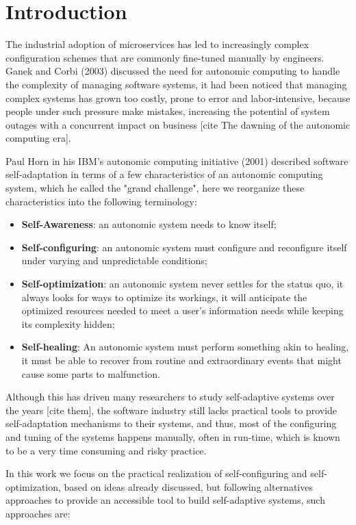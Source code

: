 \section{Introduction}

The industrial adoption of microservices has led to increasingly complex configuration schemes that are commonly fine-tuned manually by engineers. Ganek and Corbi (2003) discussed the need for autonomic computing to handle the complexity of managing software systems, it had been noticed that managing complex systems has grown too costly, prone to error and labor-intensive, because people under such pressure make mistakes, increasing the potential of system outages with a concurrent impact on business [cite The dawning of the autonomic computing era].

Paul Horn in his IBM's autonomic computing initiative (2001) described software self-adaptation in terms of a few characteristics of an autonomic computing system, which he called the "grand challenge", here we reorganize these characteristics into the following terminology:

\begin{itemize}
  \item \textbf{Self-Awareness}: an autonomic system needs to know itself;
  \item \textbf{Self-configuring}: an autonomic system must configure and reconfigure itself under varying and unpredictable conditions;
  \item \textbf{Self-optimization}: an autonomic system never settles for the status quo, it always looks for ways to optimize its workings, it will anticipate the optimized resources needed to meet a user's information needs while keeping its complexity hidden;
  \item \textbf{Self-healing}: An autonomic system must perform something akin to healing, it must be able to recover from routine and extraordinary events that might cause some parts to malfunction.
\end{itemize}

Although this has driven many researchers to study self-adaptive systems over the years [cite them], the software industry still lacks practical tools to provide self-adaptation mechanisms to their systems, and thus, most of the configuring and tuning of the systems happens manually, often in run-time, which is known to be a very time consuming and risky practice.

In this work we focus on the practical realization of self-configuring and self-optimization, based on ideas already discussed, but following alternatives approaches to provide an accessible tool to build self-adaptive systems, such approaches are:

